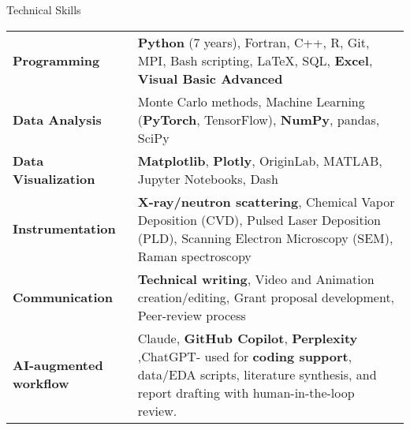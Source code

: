 
\begin{rubric}{Technical Skills}
    \begin{tabular}{@{}p{4.5cm} p{10.5cm}@{}}
        \textbf{Programming} & \textbf{Python} (7 years), Fortran, C++, R, Git, MPI, Bash scripting, LaTeX, SQL, \textbf{Excel},\textbf{ Visual Basic Advanced} \\
        \textbf{Data Analysis} & Monte Carlo methods, Machine Learning (\textbf{PyTorch}, TensorFlow), \textbf{NumPy}, pandas, SciPy \\
        \textbf{Data Visualization} & \textbf{Matplotlib}, \textbf{Plotly}, OriginLab, MATLAB, Jupyter Notebooks, Dash \\
        \textbf{Instrumentation} & \textbf{X-ray/neutron scattering}, Chemical Vapor Deposition (CVD), Pulsed Laser Deposition (PLD), Scanning Electron Microscopy (SEM), Raman spectroscopy \\
        \textbf{Communication} & \textbf{Technical writing}, Video and Animation creation/editing, Grant proposal development, Peer-review process  \\
        \textbf{AI-augmented workflow} &   Claude, \textbf{GitHub Copilot}, \textbf{Perplexity} ,ChatGPT- used for \textbf{coding support}, data/EDA scripts, literature synthesis, and report drafting with human-in-the-loop review.
    \end{tabular}
\end{rubric}
